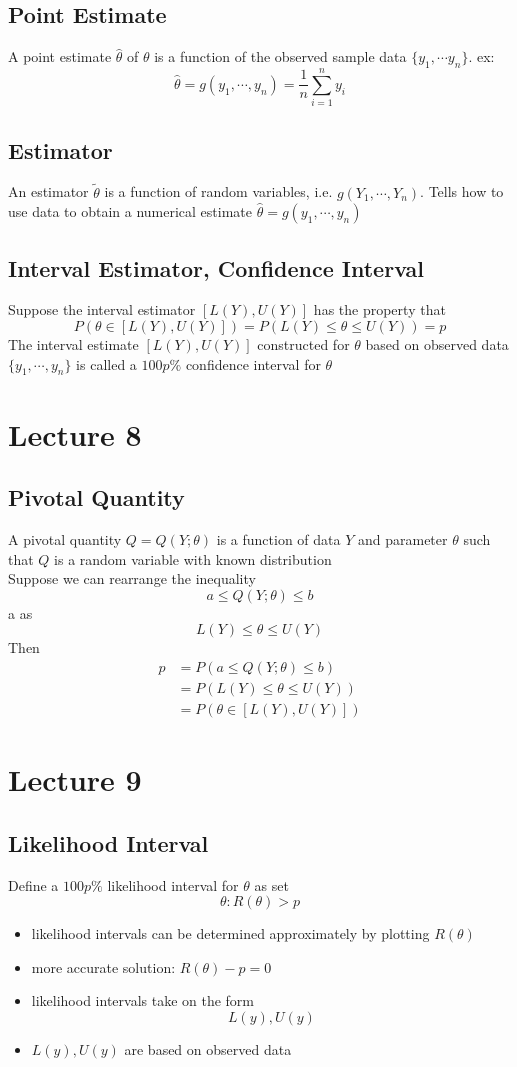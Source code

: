 \documentclass[11pt]{article}
\begin{document}
\subsection{Point Estimate}
A point estimate $\hat{\theta}$ of $\theta$ is a function of the observed sample data $\{y_1,\cdots y_n\}$. ex:
\[\hat{\theta} = g(y_1,\cdots,y_n) = \frac{1}{n}\sum_{i=1}^{n}y_i\]
\subsection{Estimator}
An estimator $\tilde{\theta}$ is a function of random variables, i.e. $g(Y_1,\cdots,Y_n)$. Tells how to use data to obtain a numerical estimate $\hat{\theta} = g(y_1,\cdots,y_n)$
\subsection{Interval Estimator, Confidence Interval}
Suppose the interval estimator $[L(Y),U(Y)]$ has the property that 
\[P(\theta\in[L(Y),U(Y)]) = P(L(Y)\leq\theta\leq U(Y)) = p\]
The interval estimate $[L(Y),U(Y)]$ constructed for $\theta$ based on observed data $\{y_1,\cdots,y_n\}$ is called a $100p\%$ confidence interval for $\theta$

\section{Lecture 8}
\subsection{Pivotal Quantity}
A pivotal quantity $Q=Q(Y;\theta)$ is a function of data $Y$ and parameter $\theta$ such that $Q$ is a random variable with known distribution \\
Suppose we can rearrange the inequality \[a\leq Q(Y;\theta)\leq b\]a
as \[L(Y)\leq\theta\leq U(Y)\]
Then 
\begin{align*}
  p &= P(a\leq Q(Y;\theta)\leq b) \\  
    &= P(L(Y)\leq\theta\leq U(Y)) \\
    &= P(\theta\in[L(Y),U(Y)])
\end{align*} 

\section{Lecture 9}
\subsection{Likelihood Interval}
Define a $100p\%$ likelihood interval for $\theta$ as set \[\theta:R(\theta)>p\]
\begin{itemize}
  \item likelihood intervals can be determined approximately by plotting $R(\theta)$
  \item more accurate solution: $R(\theta)-p=0$
  \item likelihood intervals take on the form \[L(y),U(y)\]
  \item $L(y),U(y)$ are based on observed data 
\end{itemize}
\end{document}
